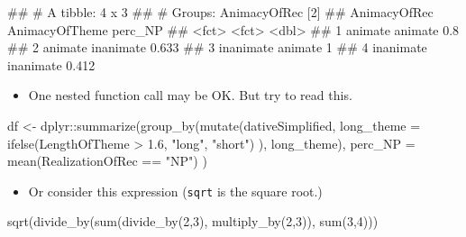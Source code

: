 \documentclass[
]{book}
\newenvironment{Shaded}{\begin{snugshade}}{\end{snugshade}}
\newcommand{\AttributeTok}[1]{\textcolor[rgb]{0.77,0.63,0.00}{#1}}
\newcommand{\DecValTok}[1]{\textcolor[rgb]{0.00,0.00,0.81}{#1}}
\newcommand{\FloatTok}[1]{\textcolor[rgb]{0.00,0.00,0.81}{#1}}
\newcommand{\FunctionTok}[1]{\textcolor[rgb]{0.00,0.00,0.00}{#1}}
\newcommand{\NormalTok}[1]{#1}
\newcommand{\OtherTok}[1]{\textcolor[rgb]{0.56,0.35,0.01}{#1}}
\newcommand{\SpecialCharTok}[1]{\textcolor[rgb]{0.00,0.00,0.00}{#1}}
\newcommand{\StringTok}[1]{\textcolor[rgb]{0.31,0.60,0.02}{#1}}
\providecommand{\tightlist}{%
  \setlength{\itemsep}{0pt}\setlength{\parskip}{0pt}}
\begin{document}
\begin{Shaded}
\begin{Highlighting}[]
\NormalTok{\#\# \# A tibble: 4 x 3}
\NormalTok{\#\# \# Groups:   AnimacyOfRec [2]}
\NormalTok{\#\#   AnimacyOfRec AnimacyOfTheme perc\_NP}
\NormalTok{\#\#   \textless{}fct\textgreater{}        \textless{}fct\textgreater{}            \textless{}dbl\textgreater{}}
\NormalTok{\#\# 1 animate      animate          0.8  }
\NormalTok{\#\# 2 animate      inanimate        0.633}
\NormalTok{\#\# 3 inanimate    animate          1    }
\NormalTok{\#\# 4 inanimate    inanimate        0.412}
\end{Highlighting}
\end{Shaded}

\begin{itemize}
\tightlist
\item
  One nested function call may be OK. But try to read this.
\end{itemize}

\begin{Shaded}
\begin{Highlighting}[]
\NormalTok{df }\OtherTok{\textless{}{-}}\NormalTok{ dplyr}\SpecialCharTok{::}\FunctionTok{summarize}\NormalTok{(}\FunctionTok{group\_by}\NormalTok{(}\FunctionTok{mutate}\NormalTok{(dativeSimplified, }\AttributeTok{long\_theme =} \FunctionTok{ifelse}\NormalTok{(LengthOfTheme }\SpecialCharTok{\textgreater{}} \FloatTok{1.6}\NormalTok{, }\StringTok{"long"}\NormalTok{, }\StringTok{"short"}\NormalTok{) ), long\_theme),}
              \AttributeTok{perc\_NP =} \FunctionTok{mean}\NormalTok{(RealizationOfRec }\SpecialCharTok{==} \StringTok{"NP"}\NormalTok{)}
\NormalTok{              )}
\end{Highlighting}
\end{Shaded}

\begin{itemize}
\tightlist
\item
  Or consider this expression (\texttt{sqrt} is the square root.)
\end{itemize}

\begin{Shaded}
\begin{Highlighting}[]
\FunctionTok{sqrt}\NormalTok{(}\FunctionTok{divide\_by}\NormalTok{(}\FunctionTok{sum}\NormalTok{(}\FunctionTok{divide\_by}\NormalTok{(}\DecValTok{2}\NormalTok{,}\DecValTok{3}\NormalTok{), }\FunctionTok{multiply\_by}\NormalTok{(}\DecValTok{2}\NormalTok{,}\DecValTok{3}\NormalTok{)), }\FunctionTok{sum}\NormalTok{(}\DecValTok{3}\NormalTok{,}\DecValTok{4}\NormalTok{)))}
\end{Highlighting}
\end{Shaded}
\end{document}
